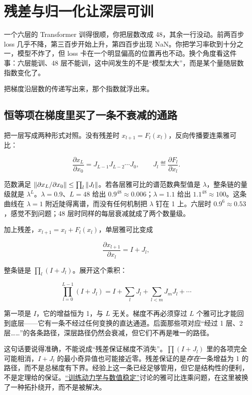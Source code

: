 \section{残差与归一化让深层可训}
\label{sec:14-Deep-Learning/05-Attention-and-Sequence-Models/04}

一个六层的 Transformer 训得很顺，你把层数改成 48，其余一行没动。前两百步 loss 几乎不降，第三百步开始上升，第四百步出现 NaN。你把学习率砍到十分之一，模型不炸了，但 loss 卡在一个明显偏高的位置再也不动。换个角度看这件事：六层能训、48 层不能训，这中间发生的不是``模型太大''，而是某个量随层数指数变化了。

把梯度沿层数的传递写出来，那个指数就浮出来。

\subsection{恒等项在梯度里买了一条不衰减的通路}

把一层写成两种形式对照。没有残差时 \(x_{l+1}=F_l(x_l)\)，反向传播要连乘雅可比：

\[
\frac{\partial x_L}{\partial x_0} = J_{L-1}J_{L-2}\cdots J_0,
\qquad J_l \eqdef \frac{\partial F_l}{\partial x_l}.
\]

范数满足 \(\left\lVert\partial x_L/\partial x_0\right\rVert\le\prod_l\left\lVert J_l\right\rVert\)。若各层雅可比的谱范数典型值是 \(\lambda\)，整条链的量级就是 \(\lambda^{L}\)。\(\lambda=0.9\)、\(L=48\) 给出 \(0.9^{48}\approx 0.006\)；\(\lambda=1.1\) 给出 \(1.1^{48}\approx 100\)。这条曲线在 \(\lambda=1\) 附近陡得离谱，而没有任何机制把 \(\lambda\) 钉在 1 上。六层时 \(0.9^{6}\approx0.53\)，感觉不到问题；48 层时同样的每层衰减就成了两个数量级。

加上残差，\(x_{l+1}=x_l+F_l(x_l)\)，单层雅可比变成

\[
\frac{\partial x_{l+1}}{\partial x_l} = I + J_l,
\]

整条链是 \(\prod_{l}(I+J_l)\)。展开这个乘积：

\[
\prod_{l=0}^{L-1}(I+J_l) = I + \sum_l J_l + \sum_{l<m} J_m J_l + \cdots
\]

第一项是 \(I\)，它的增益恒为 1，与 \(L\) 无关。梯度不再必须穿过 \(L\) 个雅可比才能回到底层——它有一条不经过任何变换的直达通道。后面那些项对应``经过 1 层、2 层……''的各条路径，深层路径仍然会衰减，但它们不再是唯一的路径。

这句话要说得准确，不能说成``残差保证梯度不消失''。\(\prod(I+J_l)\) 里的各项完全可能相消，\(I+J_l\) 的最小奇异值也可能接近零。残差保证的是\emph{存在}一条增益为 1 的路径，而不是总梯度有下界。经验上这一条已经足够管用，但它是结构性的便利，不是定理给的保证。\hyperref[sec:14-Deep-Learning/03-Optimization-and-Training/01]{``训练动力学与数值稳定''}讨论的雅可比连乘问题，在这里被换了一种拓扑绕开，而不是被解决。

